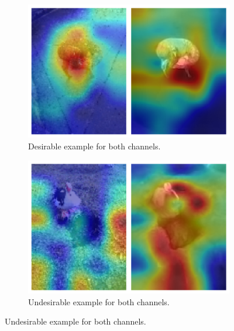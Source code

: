 \documentclass{l4proj}
\begin{document}
\begin{figure}[ht]
  \centering
  \begin{subfigure}[h!]{0.45\textwidth}
    \includegraphics[width=\textwidth]{images/evaluation/grad_cam/pos}
    \caption{Desirable example for both channels.}
    \label{fig:grad_cam_pos}
  \end{subfigure}
  \quad
  \begin{subfigure}[h!]{0.45\textwidth}
    \includegraphics[width=\textwidth]{images/evaluation/grad_cam/neg}
    \caption{Undesirable example for both channels.}
    \label{fig:grad_cam_neg}
  \end{subfigure}


\end{figure}
\end{document}
